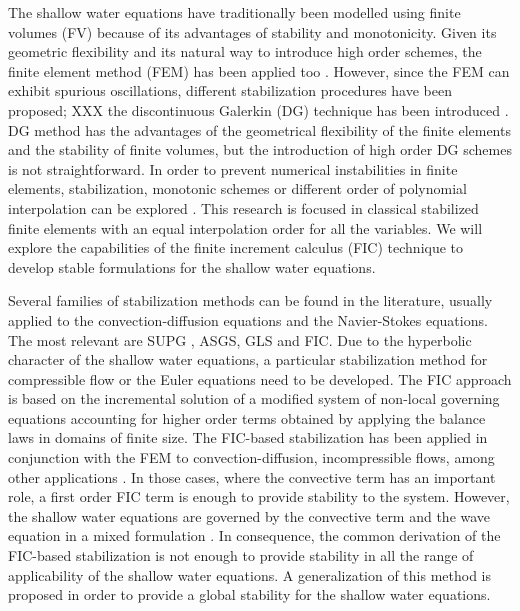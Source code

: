 \documentclass[a4paper,12pt]{article}
\begin{document}
The shallow water equations have traditionally been modelled using finite volumes (FV) because of its advantages of stability and monotonicity. Given its geometric flexibility and its natural way to introduce high order schemes, the finite element method (FEM) has been applied too \cite{zien3,navon1979,navon1988}.
However, since the FEM can exhibit spurious oscillations, different stabilization procedures have been proposed; XXX the discontinuous Galerkin (DG) technique has been introduced \cite{ambati2007,khan2014,lee2019}.
DG method has the advantages of the geometrical flexibility of the finite elements and the stability of finite volumes, but the introduction of high order DG schemes is not straightforward.
In order to prevent numerical instabilities in finite elements, stabilization, monotonic schemes or different order of polynomial interpolation can be explored \cite{hood1974,zien3,ortiz2012}.
This research is focused in classical stabilized finite elements with an equal interpolation order for all the variables. We will explore the capabilities of the finite increment calculus (FIC) technique to develop stable formulations for the shallow water equations.

Several families of stabilization methods can be found in the literature, usually applied to the convection-diffusion equations and the Navier-Stokes equations. The most relevant are SUPG \cite{brooks1982},
ASGS\cite{codina1998}, GLS \cite{hughes1989} and FIC\cite{onate1996,onate1998}.
Due to the hyperbolic character of the shallow water equations, a particular stabilization method for compressible flow or the Euler equations need to be developed.
The FIC approach is based on the incremental solution of a modified system of non-local governing equations accounting for higher order terms obtained by applying the balance laws in domains of finite size.
The FIC-based stabilization has been applied in conjunction with the FEM to convection-diffusion, incompressible flows, among other applications \cite{onate1998,onate2001}.
In those cases, where the convective term has an important role, a first order FIC term is enough to provide stability to the system.
However, the shallow water equations are governed by the convective term and the wave equation in a mixed formulation \cite{codina2008}. In consequence, the common derivation of the FIC-based stabilization is not enough to provide stability in all the range of applicability of the shallow water equations. 
A generalization of this method is proposed in order to provide a global stability for the shallow water equations.
\end{document}
